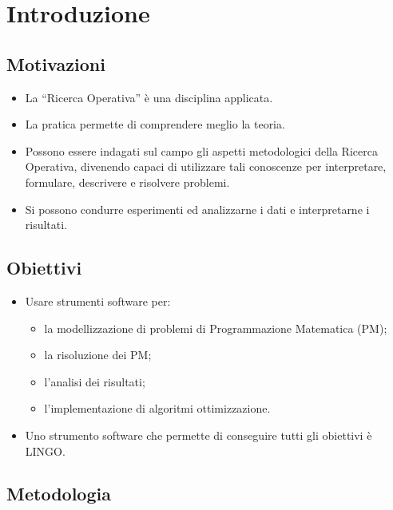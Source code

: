 \documentclass{beamer}
\def\lyxframeend{} %
\begin{document}
\generatitolo

\lyxframeend{}\section{Introduzione}


\lyxframeend{}\subsection{Motivazioni}


\lyxframeend{}
\begin{itemize}
\item La ``Ricerca Operativa'' \`e una disciplina \alert{applicata}.
\item La \alert{pratica} permette di comprendere meglio la teoria.

\item Possono essere indagati sul campo gli aspetti metodologici della Ricerca
Operativa, divenendo capaci di utilizzare tali conoscenze per interpretare,
formulare, descrivere e risolvere problemi.
\item Si possono condurre esperimenti ed analizzarne i dati e interpretarne i risultati.

\end{itemize}

\lyxframeend{}\subsection{Obiettivi}


\lyxframeend{}
\begin{itemize}
\item Usare strumenti software per: 

\begin{itemize}
\item la modellizzazione di problemi di Programmazione Matematica (PM);
\item la risoluzione dei PM;
\item l'analisi dei risultati;
\item l'implementazione di algoritmi ottimizzazione.

\end{itemize}
\item Uno strumento software che permette di conseguire tutti gli
	obiettivi \`e LINGO.
\end{itemize}

\lyxframeend{}\subsection{Metodologia}
\end{document}
